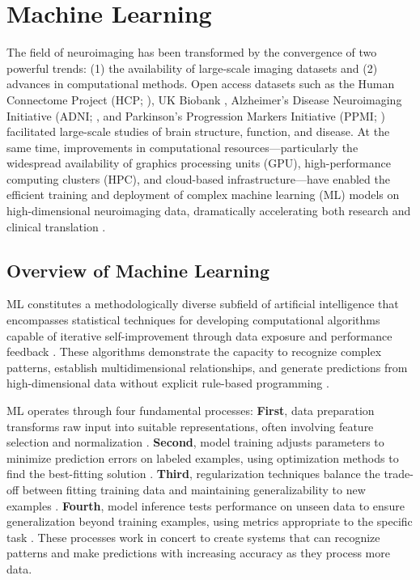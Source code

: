 \section{Machine Learning}
The field of neuroimaging has been transformed by the convergence of two powerful trends: (1) the availability of large-scale imaging datasets and (2) advances in computational methods. Open access datasets such as the Human Connectome Project (HCP; \cite{Van_Essen2013-yi}), UK Biobank \cite{Sudlow2015-lq}, Alzheimer's Disease Neuroimaging Initiative (ADNI; \cite{Petersen2010-rd}, and Parkinson's Progression Markers Initiative (PPMI; \cite{Marek2018-wx}) facilitated large-scale studies of brain structure, function, and disease. At the same time, improvements in computational resources—particularly the widespread availability of graphics processing units (GPU), high-performance computing clusters (HPC), and cloud-based infrastructure—have enabled the efficient training and deployment of complex machine learning (ML) models on high-dimensional neuroimaging data, dramatically accelerating both research and clinical translation \cite{Bouchard2016-cd,Kirimtat2024-is}.

\subsection{Overview of Machine Learning}
ML constitutes a methodologically diverse subfield of artificial intelligence that encompasses statistical techniques for developing computational algorithms capable of iterative self-improvement through data exposure and performance feedback \cite{Sarker2021-ng}. These algorithms demonstrate the capacity to recognize complex patterns, establish multidimensional relationships, and generate predictions from high-dimensional data without explicit rule-based programming \cite{Davatzikos2019-zq}.

ML operates through four fundamental processes: \textbf{First}, data preparation transforms raw input into suitable representations, often involving feature selection and normalization  \cite{Mwangi2014-nl}. \textbf{Second}, model training adjusts parameters to minimize prediction errors on labeled examples, using optimization methods to find the best-fitting solution \cite{Lemm2011-jm}. \textbf{Third}, regularization techniques balance the trade-off between fitting training data and maintaining generalizability to new examples \cite{Roberts2021-ib}. \textbf{Fourth}, model inference tests performance on unseen data to ensure generalization beyond training examples, using metrics appropriate to the specific task \cite{Varoquaux2022-as}.  These processes work in concert to create systems that can recognize patterns and make predictions with increasing accuracy as they process more data.

